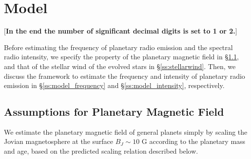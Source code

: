 \documentclass{emulateapj}
\def\memoYF#1{\color{red}$[${\bf #1}$]$ \color{black}}
\begin{document}
\section{Model}
\label{s:assumptions}

\memoYF{In the end the number of significant decimal digits is set to 1 or 2.}

Before estimating the frequency of planetary radio emission and the spectral radio intensity, we specify the property of the planetary magnetic field in \S\ref{ss:magneticfield}, and that of the stellar wind of the evolved stars in \S\ref{ss:stellarwind}.  
Then, we discuss the framework to estimate the frequency and intensity of planetary radio emission in \S\ref{ss:model_frequency} and \S\ref{ss:model_intensity}, respectively. 



\subsection{Assumptions for Planetary Magnetic Field}
\label{ss:magneticfield}

We estimate the planetary magnetic field of general planets  
simply by scaling the Jovian magnetosphere at the surface $B_J \sim 10$ G according to the planetary mass and age, based on the predicted scaling relation described below. 
\end{document}
